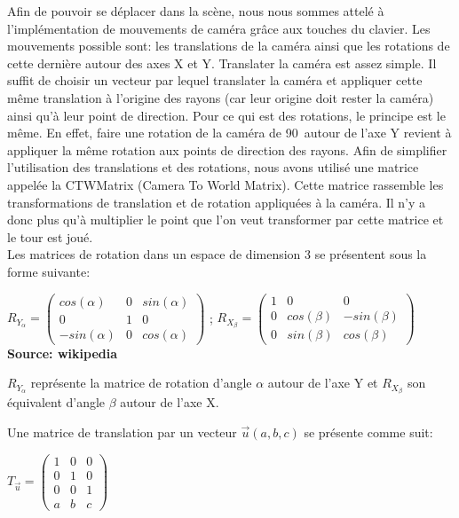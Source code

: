 \documentclass[../../Rapport RayTracer]{subfiles}
\begin{document}
Afin de pouvoir se déplacer dans la scène, nous nous sommes attelé à l'implémentation de mouvements de caméra grâce aux touches du clavier. Les mouvements possible sont: les translations de la caméra ainsi que les rotations de cette dernière autour des axes X et Y. Translater la caméra est assez simple. Il suffit de choisir un vecteur par lequel translater la caméra et appliquer cette même translation à l'origine des rayons (car leur origine doit rester la caméra) ainsi qu'à leur point de direction. Pour ce qui est des rotations, le principe est le même. En effet, faire une rotation de la caméra de 90\degree\ autour de l'axe Y revient à appliquer la même rotation aux points de direction des rayons. Afin de simplifier l'utilisation des translations et des rotations, nous avons utilisé une matrice appelée la CTWMatrix (Camera To World Matrix). Cette matrice rassemble les transformations de translation et de rotation appliquées à la caméra. Il n'y a donc plus qu'à multiplier le point que l'on veut transformer par cette matrice et le tour est joué.\\
Les matrices de rotation dans un espace de dimension 3 se présentent sous la forme suivante:

\begin{center}
	$R_{Y_{\alpha}} =
	\begin{pmatrix}
		cos(\alpha) & 0 & sin(\alpha)\\
		0 & 1 & 0\\
		-sin(\alpha) & 0 & cos(\alpha)
	\end{pmatrix}
	$ ;
	$R_{X_{\beta}} = 
	\begin{pmatrix}
		1 & 0 & 0\\
		0 & cos(\beta) & -sin(\beta)\\
		0 & sin(\beta) & cos(\beta)
	\end{pmatrix}
	$\\
	\textbf{Source: wikipedia} \cite{wikipediaRotationMatrices}
\end{center}
$R_{Y_{\alpha}}$ représente la matrice de rotation d'angle $\alpha$ autour de l'axe Y et $R_{X_{\beta}}$ son équivalent d'angle $\beta$ autour de l'axe X.

Une matrice de translation par un vecteur $\overrightarrow{u}(a, b, c)$ se présente comme suit:
\begin{center}
	$T_{\overrightarrow{u}} =
	\begin{pmatrix}
		1 & 0 & 0\\
		0 & 1 & 0\\
		0 & 0 & 1\\
		a & b & c
	\end{pmatrix}
	$
\end{center}
\end{document}
